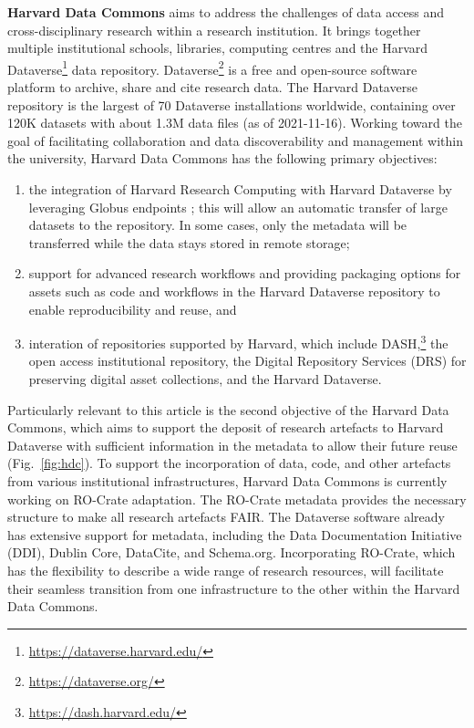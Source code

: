 \documentclass[ds,v1.1.2,openaccess]{iosart2x}%
\begin{document}
\textbf{Harvard Data Commons} \cite{doi:10.7557/5.5422} aims to address the
challenges of data access and cross-disciplinary research within a
research institution. It brings together multiple institutional
schools, libraries, computing centres and the Harvard
Dataverse\footnote{\url{https://dataverse.harvard.edu/}} data repository.
Dataverse\footnote{\url{https://dataverse.org/}} \cite{doi:10.1045/january2011-crosas}
is a free and open-source software platform to archive, share and cite
research data. The Harvard Dataverse repository is the largest of 70
Dataverse installations worldwide, containing over 120K datasets with
about 1.3M data files (as of 2021-11-16). Working toward the goal of
facilitating collaboration and data discoverability and management
within the university, Harvard Data Commons has the following primary
objectives:
\begin{enumerate}
\item[1.] the integration of Harvard Research Computing with Harvard Dataverse
by leveraging Globus endpoints \cite{doi:10.1109/MCC.2014.52}; this will
allow an automatic transfer of large datasets to the repository. In
some cases, only the metadata will be transferred while the data stays
stored in remote storage;
\item[2.] support for advanced research workflows and providing packaging
options for assets such as code and workflows in the Harvard Dataverse
repository to enable reproducibility and reuse, and
\item[3.] interation of repositories supported by Harvard, which include
DASH,\footnote{\url{https://dash.harvard.edu/}} the open access institutional
repository, the Digital Repository Services (DRS) for preserving
digital asset collections, and the Harvard Dataverse.
\end{enumerate}

Particularly relevant to this article is the second objective of the
Harvard Data Commons, which aims to support the deposit of research
artefacts to Harvard Dataverse with sufficient information in the
metadata to allow their future reuse (Fig.~\ref{fig:hdc}). To support
the incorporation of data, code, and other artefacts from various
institutional infrastructures, Harvard Data Commons is currently
working on RO-Crate adaptation. The RO-Crate metadata provides the
necessary structure to make all research artefacts FAIR. The Dataverse
software already has extensive support for metadata, including the Data
Documentation Initiative (DDI), Dublin Core, DataCite, and Schema.org.
Incorporating RO-Crate, which has the flexibility to describe a wide
range of research resources, will facilitate their seamless transition
from one infrastructure to the other within the Harvard Data Commons.
\end{document}
